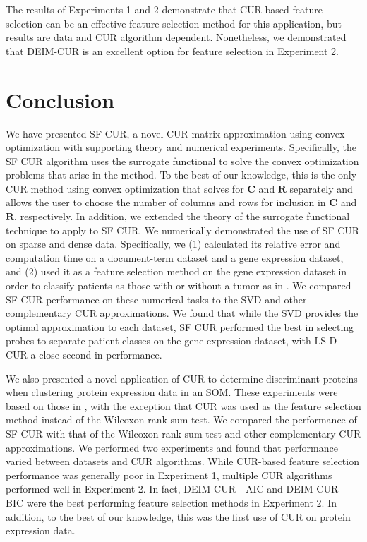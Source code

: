 \documentclass[12pt]{article}
\begin{document}
The results of Experiments 1 and 2 demonstrate that CUR-based feature selection can be an effective feature selection method for this application, but results are data and CUR algorithm dependent.  Nonetheless, we demonstrated that DEIM-CUR is an excellent option for feature selection in Experiment 2.

\section{Conclusion}
\label{sec:cur_conc}

We have presented SF CUR, a novel CUR matrix approximation using convex optimization with supporting theory and numerical experiments. Specifically, the SF CUR algorithm uses the surrogate functional \cite{daubechies_etal_2004} to solve the convex optimization problems that arise in the method.  To the best of our knowledge, this is the only CUR method using convex optimization that solves for $\mathbf{C}$ and $\mathbf{R}$ separately and allows the user to choose the number of columns and rows for inclusion in $\mathbf{C}$ and $\mathbf{R}$, respectively.  In addition, we extended the theory of the surrogate functional technique to apply to SF CUR.  
We numerically demonstrated the use of SF CUR on sparse and dense data.  Specifically, we (1) calculated its relative error and computation time on a document-term dataset and a gene expression dataset, and (2) used it as a feature selection method on the gene expression dataset in order to classify patients as those with or without a tumor as in \cite{sorenson_embree_2016}.  We compared SF CUR performance on these numerical tasks to the SVD and other complementary CUR approximations.  We found that while the SVD provides the optimal approximation to each dataset, SF CUR performed the best in selecting probes to separate patient classes on the gene expression dataset, with LS-D CUR a close second in performance.

We also presented a novel application of CUR to determine discriminant proteins when clustering protein expression data in an SOM.  These experiments were based on those in \cite{higuera_et_al_2015}, with the exception that CUR was used as the feature selection method instead of the Wilcoxon rank-sum test.  We compared the performance of SF CUR with that of the Wilcoxon rank-sum test and other complementary CUR approximations.  We performed two experiments and found that performance varied between datasets and CUR algorithms.  While CUR-based feature selection performance was generally poor in Experiment 1, multiple CUR algorithms performed well in Experiment 2.  In fact, DEIM CUR - AIC and DEIM CUR - BIC were the best performing feature selection methods in Experiment 2.  In addition, to the best of our knowledge, this was the first use of CUR on protein expression data.  
\end{document}
